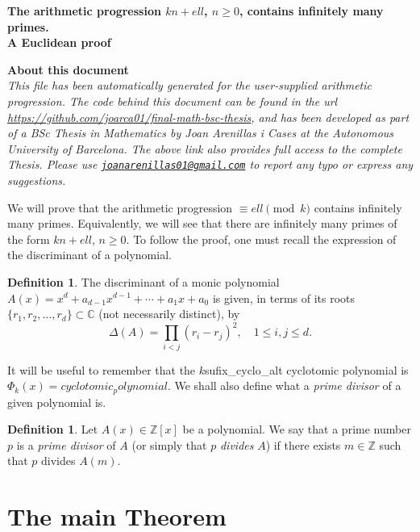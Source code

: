 \documentclass[a4paper, 12pt]{article}
\theoremstyle{definition}
\newtheorem{definition}[theorem]{Definition}
\newcommand{\Z}{\ensuremath{\mathbb{Z}}}
\newcommand{\C}{\ensuremath{\mathbb{C}}}
\renewcommand\title{\textbf{The arithmetic progression ${k}n+{ell}$, $n\geqslant0$, contains infinitely many primes.\\ A Euclidean proof}}
\begin{document}
\thispagestyle{plain}
\sloppy
\begin{center}
{\huge \bfseries \title\par}
\vspace{1cm}
\end{center}

\begin{mybox}
{\Large \textbf{About this document}}
\vspace{0.3cm}\\
\textit{This file has been automatically generated for the user-supplied arithmetic progression. The code behind this document can be found in the url \url{https://github.com/joarca01/final-math-bsc-thesis}, and has been developed as part of a BSc Thesis in Mathematics by Joan Arenillas i Cases at the Autonomous University of Barcelona. The above link also provides full access to the complete Thesis. Please use \href{mailto:joanarenillas01@gmail.com}{\nolinkurl{joanarenillas01@gmail.com}} to report any typo or express any suggestions.}
\end{mybox}
\vspace{0.5cm}

We will prove that the arithmetic progression $\equiv {ell} \pmod{{k}}$ contains infinitely many primes. Equivalently, we will see that there are infinitely many primes of the form ${k}n+{ell}$, $n\geqslant0$. To follow the proof, one must recall the expression of the discriminant of a polynomial. 
\begin{definition}
The discriminant of a monic polynomial $A(x)=x^d+a_{d-1}x^{d-1}+\cdots+a_1x+a_0$ is given, in terms of its roots $\{r_1,r_2,\dots,r_d\}\subset\C$ (not necessarily distinct), by
\begin{equation}\label{eq:discrim}
	\Delta(A)=\prod_{i<j}(r_i-r_j)^2, \quad 1\leqslant i,j\leqslant d.
\end{equation}
\end{definition}
It will be useful to remember that the ${k}${sufix_cyclo_alt} cyclotomic polynomial is $\Phi_{{k}}(x)={cyclotomic_polynomial}$. We shall also define what a \emph{prime divisor} of a given polynomial is.
\begin{definition}
Let $A(x)\in\Z[x]$ be a polynomial. We say that a prime number $p$ is a \emph{prime divisor} of $A$ (or simply that $p$ \emph{divides} $A$) if there exists $m\in\Z$ such that $p$ divides $A(m)$.
\end{definition}

\section{The main Theorem}\label{sec:mainTh}
\end{document}
